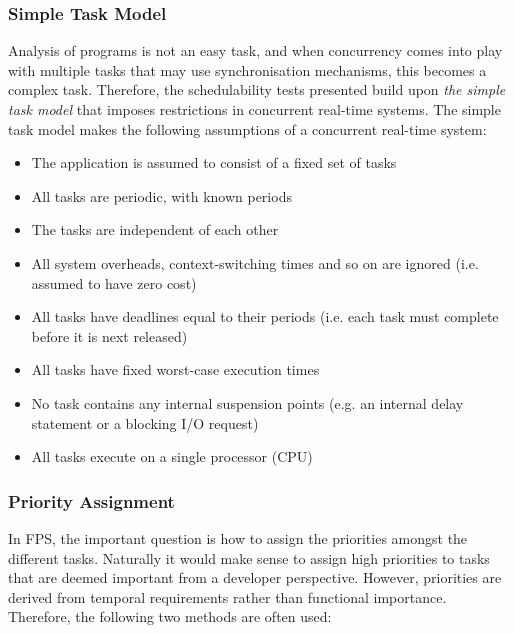 \subsubsection{Simple Task Model}
\label{subsub:taskmodel}
Analysis of programs is not an easy task, and when concurrency comes into play with multiple tasks that may use synchronisation mechanisms, this becomes a complex task. Therefore, the schedulability tests presented build upon \textit{the simple task model} that imposes restrictions in concurrent real-time systems. The simple task model makes the following assumptions of a concurrent real-time system:

\begin{itemize}
	\item The application is assumed to consist of a fixed set of tasks
	\item All tasks are periodic, with known periods
	\item The tasks are independent of each other
	\item All system overheads, context-switching times and so on are ignored (i.e. assumed to have zero cost)
	\item All tasks have deadlines equal to their periods (i.e. each task must complete before it is next released)
	\item All tasks have fixed worst-case execution times
	\item No task contains any internal suspension points (e.g. an internal delay statement or a blocking I/O request)
	\item All tasks execute on a single processor (CPU)
\end{itemize}

\subsubsection{Priority Assignment}
In FPS, the important question is how to assign the priorities amongst the different tasks. Naturally it would make sense to assign high priorities to tasks that are deemed important from a developer perspective. However, priorities are derived from temporal requirements rather than functional importance. Therefore, the following two methods are often used:

